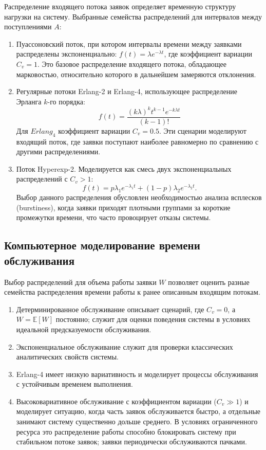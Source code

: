 Распределение входящего потока заявок определяет временную структуру нагрузки на систему. Выбранные семейства распределений для интервалов между поступлениями $A$:

\begin{enumerate}
    \item Пуассоновский поток, при котором интервалы времени между заявками распределены экспоненциально: $f(t) = \lambda e^{-\lambda t}$, где коэффициент вариации $C_v = 1$. Это базовое распределение входящего потока, обладающее марковостью, относительно которого в дальнейшем замеряются отклонения\cite{bocharov_pechinkin_tmo,adan_resing2015_queueing_systems}.
    \item Регулярные потоки Erlang-2 и Erlang-4, использующее распределение Эрланга $k$-го порядка\cite{adan_resing2015_queueing_systems}:
    $$
        f(t) = \frac{(k\lambda)^k t^{k-1} e^{-k\lambda t}}{(k-1)!}
    $$
    Для $Erlang_4$ коэффициент вариации $C_v = 0.5$. Эти сценарии моделируют входящий поток, где заявки поступают наиболее равномерно по сравнению с другими распределениями.
    \item Поток Hyperexp-2\cite{vishnevskii_dudin_correlated_arrivals_2017,paxson_floyd_1995_poisson_failure}. Моделируется как смесь двух экспоненциальных распределений с $C_v > 1$:
    $$
        f(t) = p \lambda_1 e^{-\lambda_1 t} + (1-p) \lambda_2 e^{-\lambda_2 t}.
    $$
    Выбор данного распределения обусловлен необходимостью анализа всплесков (burstiness), когда заявки приходят плотными группами за короткие промежутки времени, что часто провоцирует отказы системы.
\end{enumerate}

\subsection{Компьютерное моделирование времени обслуживания}

Выбор распределений для объема работы заявки $W$ позволяет оценить разные семейства распределения времени работы к ранее описанным входящим потокам. 

\begin{enumerate}
    \item Детерминированное обслуживание описывает сценарий, где $C_v = 0$, а $W = \mathbb{E}[W]$ постоянно; служит для оценки поведения системы в условиях идеальной предсказуемости обслуживания.
    \item Экспоненциальное обслуживание служит для проверки классических аналитических свойств системы.
    \item Erlang-4 имеет низкую вариативность и моделирует процессы обслуживания с устойчивым временем выполнения.
    \item Высоковариативное обслуживание с коэффициентом вариации ($C_v \gg 1$) и моделирует ситуацию, когда часть заявок обслуживается быстро, а отдельные занимают систему существенно дольше среднего. 
    В условиях ограниченного ресурса это распределение работы способно блокировать систему при стабильном потоке заявок; заявки периодически обслуживаются пачками.
\end{enumerate}

